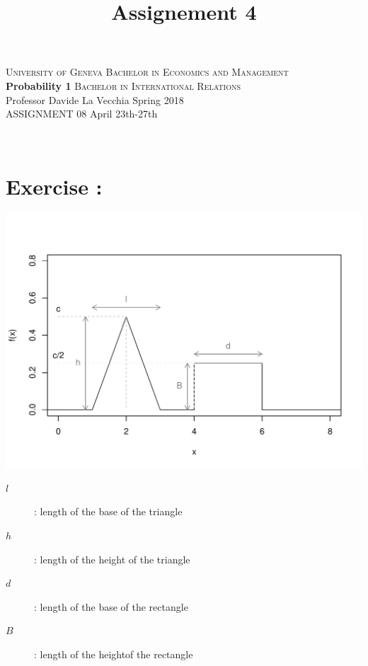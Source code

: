 \documentclass[12pt,thmsa]{article}
\title{Assignement 4}
\begin{document}
\noindent \textsc{University of Geneva}     \hfill \textsc{Bachelor in Economics and Management} \\
\textbf{Probability 1}                      \hfill \textsc{Bachelor in International Relations} \\
Professor Davide La Vecchia                 \hfill Spring 2018  \\
ASSIGNMENT 08                               \hfill   April 23th-27th



\noindent
\makebox[\linewidth]{\rule{\textwidth}{0.4pt}}\\[1.5ex]


\addtocounter{section}{1}
\section*{Exercise \thesection:}

\centerline{\includegraphics{figure_corrige.pdf}} 

    \begin{center}
   \begin{description}
    \item[$l$]: length of the base of the triangle
    \item[$h$]: length of the height of the triangle
    \item[$d$]: length of the base of the rectangle
    \item[$B$]: length of the heightof the rectangle
    \end{description}
     \end{center}
   
    \newpage
    
\end{document}
